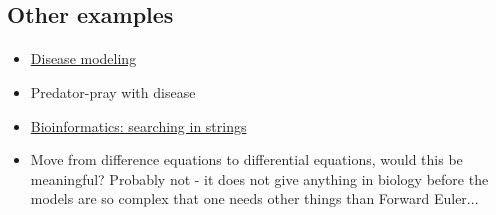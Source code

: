 \documentclass[%
twoside,                 %
final,                   %
10pt]{article}
\begin{document}
\subsection{Other examples}

\paragraph{}
\begin{itemize}
 \item \href{{http://hplgit.github.io/disease-modeling/doc/web/index.html}}{Disease modeling}

 \item Predator-pray with disease

 \item \href{{http://hplgit.github.io/bioinf-py/doc/web/index.html}}{Bioinformatics: searching in strings}

 \item Move from difference equations to differential equations, would this be meaningful? Probably not - it does not give anything in biology before the models are so complex that one needs other things than Forward Euler...
\end{itemize}

\noindent





\printindex
\end{document}
